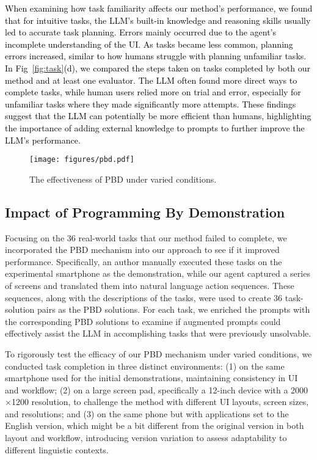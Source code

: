\textcolor{black}{
When examining how task familiarity affects our method's performance, we found that for intuitive tasks, the LLM's built-in knowledge and reasoning skills usually led to accurate task planning. Errors mainly occurred due to the agent's incomplete understanding of the UI. As tasks became less common, planning errors increased, similar to how humans struggle with planning unfamiliar tasks. In Fig~\ref{fig:task}(d), we compared the steps taken on tasks completed by both our method and at least one evaluator. The LLM often found more direct ways to complete tasks, while human users relied more on trial and error, especially for unfamiliar tasks where they made significantly more attempts. These findings suggest that the LLM can potentially be more efficient than humans, highlighting the importance of adding external knowledge to prompts to further improve the LLM's performance.
}

\begin{figure}
    \centering
    \texttt{[image: figures/pbd.pdf]}
    \caption{The effectiveness of PBD under varied conditions.}
    \label{fig:pbd}
\end{figure}

\subsection{Impact of Programming By Demonstration}
Focusing on the 36 real-world tasks that our method failed to complete, we incorporated the PBD mechanism into our approach to see if it improved performance. Specifically, an author manually executed these tasks on the experimental smartphone as the demonstration, while our agent captured a series of screens and translated them into natural language action sequences. These sequences, along with the descriptions of the tasks, were used to create 36 task-solution pairs as the PBD solutions. For each task, we enriched the prompts with the corresponding PBD solutions to examine if augmented prompts could effectively assist the LLM in accomplishing tasks that were previously unsolvable.

To rigorously test the efficacy of our PBD mechanism under varied conditions, we conducted task completion in three distinct environments: (1) on the same smartphone used for the initial demonstrations, maintaining consistency in UI and workflow; (2) on a large screen pad, specifically a 12-inch device with a 2000$\times$1200 resolution, to challenge the method with different UI layouts, screen sizes, and resolutions; and (3) on the same phone but with applications set to the English version, which might be a bit different from the original version in both layout and workflow, introducing version variation to assess adaptability to different linguistic contexts.


